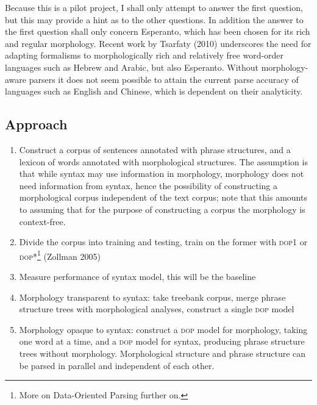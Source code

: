\documentclass[10pt,a4paper]{article}
\begin{document}

Because this is a pilot project, I shall only attempt to answer the first
question, but this may provide a hint as to the other questions. In addition
the answer to the first question shall only concern Esperanto, which has been
chosen for its rich and regular morphology. Recent work by Tsarfaty (2010)
underscores the need for adapting formalisms to morphologically rich and
relatively free word-order languages such as Hebrew and Arabic, but also
Esperanto. Without morphology-aware parsers it does not seem possible to attain
the current parse accuracy of languages such as English and Chinese, which is 
dependent on their analyticity.

\subsection{Approach}

\begin{enumerate}

\item Construct a corpus of sentences annotated with phrase structures, and a 
lexicon of words annotated with morphological structures. The assumption is
that while syntax may use information in morphology, morphology does not need
information from syntax, hence the possibility of constructing a morphological
corpus independent of the text corpus; note that this amounts to assuming that
for the purpose of constructing a corpus the morphology is context-free.

\item Divide the corpus into training and testing, train on the former with \textsc{dop1} or 
\textsc{dop*}\footnote{More on Data-Oriented Parsing further on.} (Zollman 2005) %

\item Measure performance of syntax model, this will be the baseline

\item Morphology transparent to syntax: take treebank corpus, merge phrase 
structure trees with morphological analyses, construct a single \textsc{dop} model

\item Morphology opaque to syntax: construct a \textsc{dop} model for morphology, taking
one word at a time, and a \textsc{dop} model for syntax, producing phrase structure
trees without morphology. Morphological structure and phrase structure can be
parsed in parallel and independent of each other.

\end{enumerate}
\end{document}
